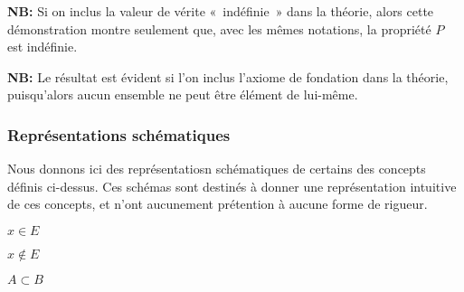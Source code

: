 \hfill\square

\medskip

\noindent\textbf{NB:} Si on inclus la valeur de vérite « indéfinie » dans la théorie, alors cette démonstration montre seulement que, avec les mêmes notations, la propriété $P$ est indéfinie.

\medskip

\noindent\textbf{NB:} Le résultat est évident si l'on inclus l'axiome de fondation dans la théorie, puisqu'alors aucun ensemble ne peut être élément de lui-même.


\subsubsection{Représentations schématiques}

Nous donnons ici des représentatiosn schématiques de certains des concepts définis ci-dessus. 
Ces schémas sont destinés à donner une représentation intuitive de ces concepts, et n'ont aucunement prétention à aucune forme de rigueur.

\bigskip
\bigskip

\begin{minipage}{\linewidth}
\centering
{}

$x \in E$
\end{minipage}

\bigskip
\bigskip

\begin{minipage}{\linewidth}
\centering
{}

$x \notin E$
\end{minipage}

\bigskip
\bigskip

\begin{minipage}{\linewidth}
\centering
{}

$A \subset B$
\end{minipage}

